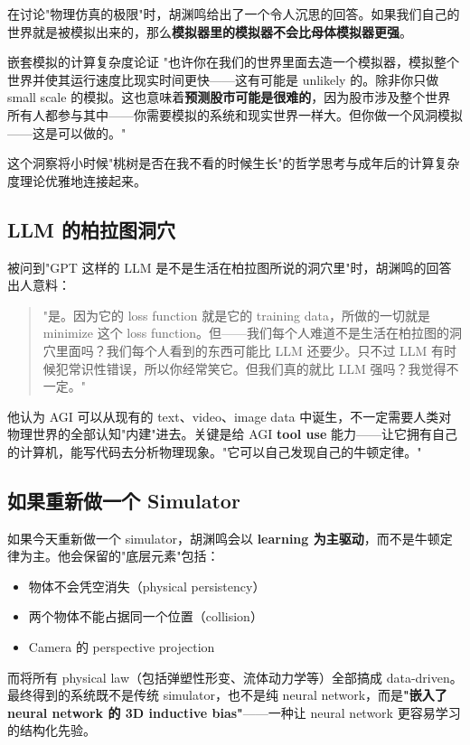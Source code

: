 \documentclass[a4paper]{article}
\begin{document}
在讨论"物理仿真的极限"时，胡渊鸣给出了一个令人沉思的回答。如果我们自己的世界就是被模拟出来的，那么\textbf{模拟器里的模拟器不会比母体模拟器更强}。

\begin{knowledgebox}{嵌套模拟的计算复杂度论证}
"也许你在我们的世界里面去造一个模拟器，模拟整个世界并使其运行速度比现实时间更快——这有可能是 unlikely 的。除非你只做 small scale 的模拟。这也意味着\textbf{预测股市可能是很难的}，因为股市涉及整个世界所有人都参与其中——你需要模拟的系统和现实世界一样大。但你做一个风洞模拟——这是可以做的。"
\end{knowledgebox}

这个洞察将小时候"桃树是否在我不看的时候生长"的哲学思考与成年后的计算复杂度理论优雅地连接起来。

\subsection{LLM 的柏拉图洞穴}

被问到"GPT 这样的 LLM 是不是生活在柏拉图所说的洞穴里"时，胡渊鸣的回答出人意料：

\begin{quote}
"是。因为它的 loss function 就是它的 training data，所做的一切就是 minimize 这个 loss function。但——我们每个人难道不是生活在柏拉图的洞穴里面吗？我们每个人看到的东西可能比 LLM 还要少。只不过 LLM 有时候犯常识性错误，所以你经常笑它。但我们真的就比 LLM 强吗？我觉得不一定。"
\end{quote}

他认为 AGI 可以从现有的 text、video、image data 中诞生，不一定需要人类对物理世界的全部认知"内建"进去。关键是给 AGI \textbf{tool use} 能力——让它拥有自己的计算机，能写代码去分析物理现象。"它可以自己发现自己的牛顿定律。"

\subsection{如果重新做一个 Simulator}

如果今天重新做一个 simulator，胡渊鸣会以 \textbf{learning 为主驱动}，而不是牛顿定律为主。他会保留的"底层元素"包括：
\begin{itemize}
\item 物体不会凭空消失（physical persistency）
\item 两个物体不能占据同一个位置（collision）
\item Camera 的 perspective projection
\end{itemize}

而将所有 physical law（包括弹塑性形变、流体动力学等）全部搞成 data-driven。最终得到的系统既不是传统 simulator，也不是纯 neural network，而是\textbf{"嵌入了 neural network 的 3D inductive bias"}——一种让 neural network 更容易学习的结构化先验。
\end{document}
